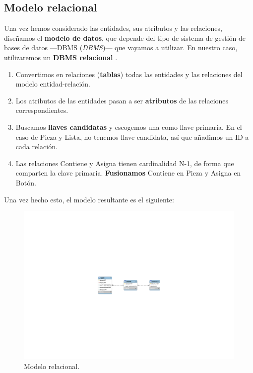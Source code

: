 \smallskip

\subsection{Modelo relacional}

Una vez hemos considerado las entidades, sus atributos y las relaciones, diseñamos el \textbf{modelo de datos}, que depende del tipo de sistema de gestión de bases de datos ---\acrshort{DBMS} (\textit{\acrlong{DBMS}})--- que vayamos a utilizar. En nuestro caso, utilizaremos un \textbf{\acrshort{DBMS} relacional} \cite{bdrel}.

\begin{enumerate}
	\item Convertimos en relaciones (\textbf{tablas}) todas las entidades y las relaciones del modelo entidad-relación.
	\item Los atributos de las entidades pasan a ser \textbf{atributos} de las relaciones correspondientes.
	\item Buscamos \textbf{llaves candidatas} y escogemos una como llave primaria. En el caso de Pieza y Lista, no tenemos llave candidata, así que añadimos un ID a cada relación.
	\item Las relaciones Contiene y Asigna tienen cardinalidad N-1, de forma que comparten la clave primaria. \textbf{Fusionamos} Contiene en Pieza y Asigna en Botón.
\end{enumerate}

Una vez hecho esto, el modelo resultante es el siguiente:

\smallskip

\begin{figure}[H]
	\noindent \begin{centering}
		\includegraphics[clip=true, trim=390 340 390 340, width=\linewidth*3/4]{capitulo4/bd_rel}
		\par\end{centering}
	\smallskip
	\caption{\label{fig:bd_rel} Modelo relacional.}
\end{figure} 

